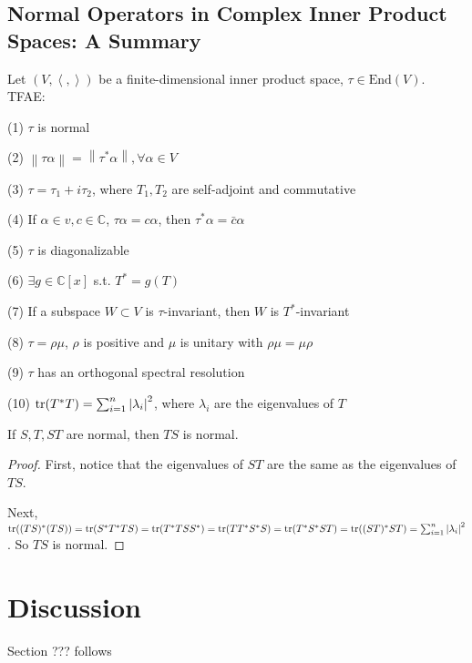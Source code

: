 \subsection{Normal Operators in Complex Inner Product Spaces: A Summary}
\begin{theorem}
    Let $(V,\left\langle,\right\rangle)$ be a finite-dimensional inner product space, $\tau\in \text{End}(V)$. TFAE:\par
(1) $\tau$ is normal \par
(2) $\left\|\tau \alpha \right\|=\left\|\tau^*\alpha\right\|,\forall\alpha\in V$\par
(3) $\tau=\tau_1+i\tau_2$, where $T_1,T_2$ are self-adjoint and commutative\par
(4) If $\alpha\in v,c\in \mathbb{C}$, $\tau\alpha=c\alpha$, then $\tau^*\alpha=\bar{c}\alpha$\par
(5) $\tau$ is diagonalizable\par
(6) $\exists g\in\mathbb{C}[x]$ s.t. $T^*=g(T)$\par
(7) If a subspace $W\subset V$ is $\tau$-invariant, then $W$ is $T^*$-invariant\par
(8) $\tau=\rho\mu$, $\rho$ is positive and $\mu$ is unitary with $\rho\mu=\mu\rho$\par
(9) $\tau$ has an orthogonal spectral resolution\par
(10) $\operatorname{tr}(T^*T)=\sum_{i=1}^n \left|\lambda_i\right|^2$, where $\lambda_i$ are the eigenvalues of $T$
\end{theorem}
\begin{theorem}
    If $S,T,ST$ are normal, then $TS$ is normal.
\end{theorem}
\begin{proof}
    First, notice that the eigenvalues of $ST$ are the same as the eigenvalues of $TS$.\par
    Next, $\operatorname{tr}((TS)^*(TS))=\operatorname{tr}(S^*T^*TS)=\operatorname{tr}(T^*TSS^*)=\operatorname{tr}(TT^*S^*S)=\operatorname{tr}(T^*S^*ST)=\operatorname{tr}((ST)^*ST)=\sum_{i=1}^n\left|\lambda_i\right|^2$.
So $TS$ is normal.
\end{proof}


\section{Discussion}

Section ??? follows \citet{RomanSteven2013Ala}